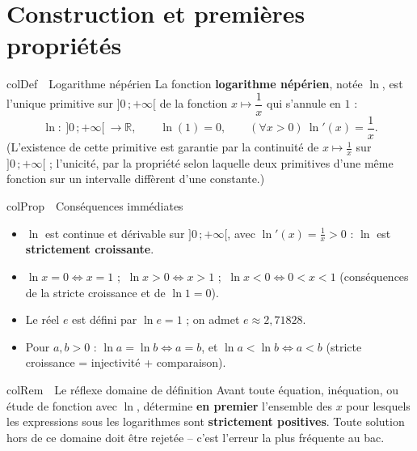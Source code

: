 \documentclass[11pt,a4paper]{article}
\newenvironment{definition}[1][Définition]
  {\begin{fiche}{colDef}{\ding{110}~~#1}}{\end{fiche}}
\newenvironment{propriete}[1][Propriété]
  {\begin{fiche}{colProp}{\ding{72}~~#1}}{\end{fiche}}
\newenvironment{remarque}[1][Remarque]
  {\begin{fiche}{colRem}{\ding{43}~~#1}}{\end{fiche}}
\begin{document}
\vspace{4mm}

\section{Construction et premières propriétés}

\begin{definition}[Logarithme népérien]
La fonction \textbf{logarithme népérien}, notée $\ln$, est l'unique primitive sur $]0\,;+\infty[$ de la fonction $x \mapsto \dfrac{1}{x}$ qui s'annule en $1$ :
\[
  \ln : \ ]0\,;+\infty[\ \to \mathbb{R}, \qquad \ln(1) = 0, \qquad (\forall x > 0)\ \ln'(x) = \frac{1}{x}.
\]
(L'existence de cette primitive est garantie par la continuité de $x \mapsto \frac{1}{x}$ sur $]0\,;+\infty[$ ; l'unicité, par la propriété selon laquelle deux primitives d'une même fonction sur un intervalle diffèrent d'une constante.)
\end{definition}

\begin{propriete}[Conséquences immédiates]
\begin{itemize}[leftmargin=6mm, itemsep=0.5mm]
  \item $\ln$ est continue et dérivable sur $]0\,;+\infty[$, avec $\ln'(x) = \frac{1}{x} > 0$ : $\ln$ est \textbf{strictement croissante}.
  \item $\ln x = 0 \iff x = 1$ ; $\ \ln x > 0 \iff x > 1$ ; $\ \ln x < 0 \iff 0 < x < 1$ (conséquences de la stricte croissance et de $\ln 1 = 0$).
  \item Le réel $e$ est défini par $\ln e = 1$ ; on admet $e \approx 2{,}71828$.
  \item Pour $a, b > 0$ : $\ln a = \ln b \iff a = b$, et $\ln a < \ln b \iff a < b$ (stricte croissance = injectivité + comparaison).
\end{itemize}
\end{propriete}

\begin{remarque}[Le réflexe domaine de définition]
Avant toute équation, inéquation, ou étude de fonction avec $\ln$, détermine \textbf{en premier} l'ensemble des $x$ pour lesquels les expressions sous les logarithmes sont \textbf{strictement positives}. Toute solution hors de ce domaine doit être rejetée -- c'est l'erreur la plus fréquente au bac.
\end{remarque}

\end{document}
